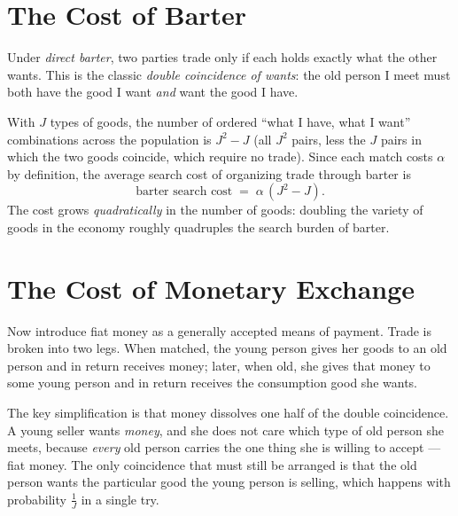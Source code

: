 \section{The Cost of Barter}

Under \emph{direct barter}, two parties trade only if each holds exactly what the other wants. This is the classic \emph{double coincidence of wants}: the old person I meet must both have the good I want \emph{and} want the good I have.


With $J$ types of goods, the number of ordered ``what I have, what I want'' combinations across the population is $J^2 - J$ (all $J^2$ pairs, less the $J$ pairs in which the two goods coincide, which require no trade). Since each match costs $\alpha$ by definition, the average search cost of organizing trade through barter is
\[
\text{barter search cost} \;=\; \alpha\,(J^2 - J).
\]
The cost grows \emph{quadratically} in the number of goods: doubling the variety of goods in the economy roughly quadruples the search burden of barter.

\section{The Cost of Monetary Exchange}

Now introduce fiat money as a generally accepted means of payment. Trade is broken into two legs. When matched, the young person gives her goods to an old person and in return receives money; later, when old, she gives that money to some young person and in return receives the consumption good she wants.

The key simplification is that money dissolves one half of the double coincidence. A young seller wants \emph{money}, and she does not care which type of old person she meets, because \emph{every} old person carries the one thing she is willing to accept --- fiat money. The only coincidence that must still be arranged is that the old person wants the particular good the young person is selling, which happens with probability $\tfrac1J$ in a single try.


